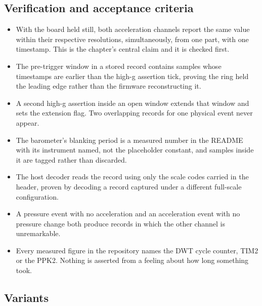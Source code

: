 \subsection*{Verification and acceptance criteria}

\begin{itemize}
\item With the board held still, both acceleration channels report the same
value within their respective resolutions, simultaneously, from one part, with
one timestamp. This is the chapter's central claim and it is checked first.
\item The pre-trigger window in a stored record contains samples whose
timestamps are earlier than the high-g assertion tick, proving the ring held the
leading edge rather than the firmware reconstructing it.
\item A second high-g assertion inside an open window extends that window and
sets the extension flag. Two overlapping records for one physical event never
appear.
\item The barometer's blanking period is a measured number in the README with
its instrument named, not the placeholder constant, and samples inside it are
tagged rather than discarded.
\item The host decoder reads the record using only the scale codes carried in
the header, proven by decoding a record captured under a different full-scale
configuration.
\item A pressure event with no acceleration and an acceleration event with no
pressure change both produce records in which the other channel is unremarkable.
\item Every measured figure in the repository names the DWT cycle counter, TIM2
or the PPK2. Nothing is asserted from a feeling about how long something took.
\end{itemize}

\subsection*{Variants}


